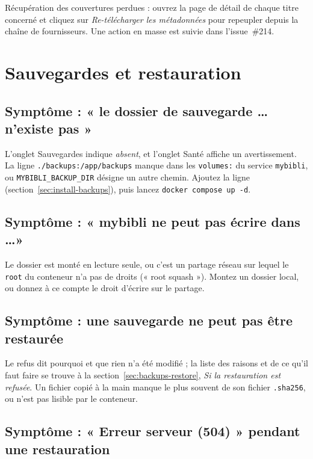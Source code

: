Récupération des couvertures perdues : ouvrez la page de détail de
chaque titre concerné et cliquez sur \emph{Re-télécharger les
métadonnées} pour repeupler depuis la chaîne de fournisseurs. Une
action en masse est suivie dans l'issue~\#214.

\section{Sauvegardes et restauration}\label{sec:troubleshoot-backups}

\subsection*{Symptôme : « le dossier de sauvegarde \dots{} n'existe pas »}

L'onglet Sauvegardes indique \emph{absent}, et l'onglet Santé affiche
un avertissement. La ligne \texttt{./backups:\allowbreak /app/backups} manque dans
les \texttt{volumes:} du service \texttt{mybibli}, ou
\texttt{MYBIBLI\_BACKUP\_DIR} désigne un autre chemin. Ajoutez la ligne
(section~\ref{sec:install-backups}), puis lancez
\texttt{docker compose up -d}.

\subsection*{Symptôme : « mybibli ne peut pas écrire dans \dots »}

Le dossier est monté en lecture seule, ou c'est un partage réseau sur
lequel le \texttt{root} du conteneur n'a pas de droits (« root
squash »). Montez un dossier local, ou donnez à ce compte le droit
d'écrire sur le partage.

\subsection*{Symptôme : une sauvegarde ne peut pas être restaurée}

Le refus dit pourquoi et que rien n'a été modifié ; la liste des raisons
et de ce qu'il faut faire se trouve à la section~\ref{sec:backups-restore},
\emph{Si la restauration est refusée}. Un fichier copié à la main manque
le plus souvent de son fichier \texttt{.sha256}, ou n'est pas lisible
par le conteneur.

\subsection*{Symptôme : « Erreur serveur (504) » pendant une restauration}

